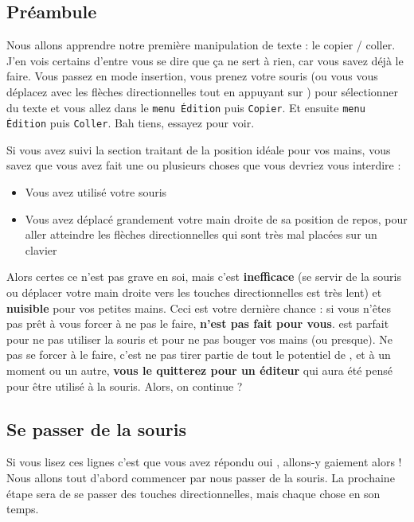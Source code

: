 \subsection{Préambule}

Nous allons apprendre notre première manipulation de texte : le copier / coller. J'en vois certains d'entre vous se dire que ça ne sert à rien, car vous savez déjà le faire. Vous passez en mode insertion, vous prenez votre souris (ou vous vous déplacez avec les flèches directionnelles tout en appuyant sur \ttshift) pour sélectionner du texte et vous allez dans le \Verb|menu Édition| puis \Verb|Copier|. Et ensuite \Verb|menu Édition| puis \Verb|Coller|. Bah tiens, essayez pour voir.

Si vous avez suivi la section \og {} \fg{} traitant de la position idéale pour vos mains, vous savez que vous avez fait une ou plusieurs choses que vous devriez vous interdire :


\begin{itemize}
    \item Vous avez utilisé votre souris
    \item Vous avez déplacé grandement votre main droite de sa position de repos, pour aller atteindre les flèches directionnelles qui sont très mal placées sur un clavier
\end{itemize}


Alors certes ce n'est pas grave en soi, mais c'est \textbf{inefficace} (se servir de la souris ou déplacer votre main droite vers les touches directionnelles est très lent) et \textbf{nuisible} pour vos petites mains. Ceci est votre dernière chance : si vous n'êtes pas prêt à vous forcer à ne pas le faire, \textbf{\vim n'est pas fait pour vous}. \vim est parfait pour ne pas utiliser la souris et pour ne pas bouger vos mains (ou presque). Ne pas se forcer à le faire, c'est ne pas tirer partie de tout le potentiel de \vim, et à un moment ou un autre, \textbf{vous le quitterez pour un éditeur} qui aura été pensé pour être utilisé à la souris. Alors, on continue ?

\subsection{Se passer de la souris}

Si vous lisez ces lignes c'est que vous avez répondu \og oui \fg, allons-y gaiement alors ! Nous allons tout d'abord commencer par nous passer de la souris. La prochaine étape sera de se passer des touches directionnelles, mais chaque chose en son temps.


